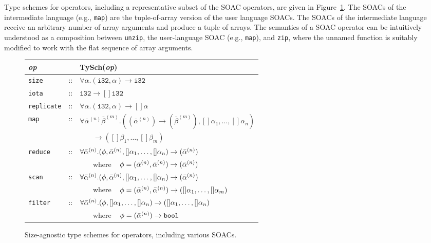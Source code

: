 Type schemes for operators, including a representative subset of the
SOAC operators, are given in Figure~\ref{fig:soacType}.  The SOACs of
the intermediate language (e.g., \lstinline{map}) are the
tuple-of-array version of the user language SOACs. The SOACs of the
intermediate language receive an arbitrary number of array arguments
and produce a tuple of arrays. The semantics of a SOAC operator can be
intuitively understood as a composition between \texttt{unzip}, the
user-language SOAC (e.g., \texttt{map}), and \texttt{zip}, where the
unnamed function is suitably modified to work with the flat sequence
of array arguments.

\begin{figure}[hbt]
\begin{tabular}{lcl}
\emph{op} & & \textrm{TySch}(\emph{op}) \\ \hline
{\lstinline!size!} & :: & $\forall\alpha.(\texttt{i32},\alpha) \rightarrow \texttt{i32}$ \\
{\lstinline!iota!} & :: & $\texttt{i32} \rightarrow []\texttt{i32}$ \\
{\lstinline!replicate!} & :: & $\forall\alpha.(\texttt{i32},\alpha) \rightarrow []\alpha$ \\
{\lstinline!map!} & :: & $\forall\bar{\alpha}^{(n)}\bar{\beta}^{(m)}. ((\bar{\alpha}^{(n)}) \rightarrow (\bar{\beta}^{(m)}), []\alpha_1,\ldots,[]\alpha_n)$ \\
           & & ~~~ $\rightarrow ([]\beta_1,\ldots,[]\beta_m)$ \\
{\lstinline!reduce!} & :: & $\forall\bar{\alpha}^{(n)}.(\phi,\bar{\alpha}^{(n)},[]\alpha_1,\ldots,[]\alpha_n) \rightarrow (\bar{\alpha}^{(n)})$ \\
& & ~~~ where ~ $\phi = (\bar{\alpha}^{(n)},\bar{\alpha}^{(n)}) \rightarrow (\bar{\alpha}^{(n)})$ \\

{\lstinline!scan!} & :: & $\forall\bar{\alpha}^{(n)}.(\phi,\bar{\alpha}^{(n)},[]\alpha_1,\ldots,[]\alpha_n) \rightarrow (\bar{\alpha}^{(n)})$ \\
& & ~~~ where ~ $\phi = (\bar{\alpha}^{(n)},\bar{\alpha}^{(n)}) \rightarrow ([]\alpha_1,\ldots,[]\alpha_m)$ \\

{\lstinline!filter!} & :: & $\forall\bar{\alpha}^{(n)}.(\phi,[]\alpha_1,\ldots,[]\alpha_n) \rightarrow ([]\alpha_1,\ldots,[]\alpha_n)$ \\
& & ~~~ where ~ $\phi = (\bar{\alpha}^{(n)}) \rightarrow \texttt{bool}$
\end{tabular}
\caption{Size-agnostic type schemes for operators, including various SOACs.}
\label{fig:soacType}
\end{figure}

